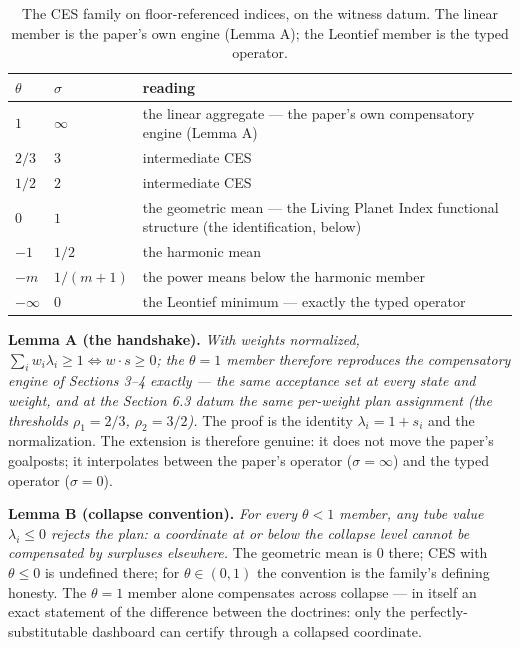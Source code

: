 \documentclass[3p,11pt]{elsarticle}
\begin{document}
\begin{table}[htbp]
\centering
\small
\caption{The CES family on floor-referenced indices, on the witness
datum. The linear member is the paper's own engine (Lemma A); the
Leontief member is the typed operator.}
\label{tab:sigmafamily}
\begin{tabular}{@{}llp{7.4cm}@{}}
\toprule
\(\theta\) & \(\sigma\) & reading \\
\midrule
\(1\) & \(\infty\) & the linear aggregate --- the paper's own compensatory engine (Lemma A) \\
\(2/3\) & \(3\) & intermediate CES \\
\(1/2\) & \(2\) & intermediate CES \\
\(0\) & \(1\) & the geometric mean --- the Living Planet Index functional structure (the identification, below) \\
\(-1\) & \(1/2\) & the harmonic mean \\
\(-m\) & \(1/(m+1)\) & the power means below the harmonic member \\
\(-\infty\) & \(0\) & the Leontief minimum --- exactly the typed operator \\
\bottomrule
\end{tabular}
\end{table}

\textbf{Lemma A (the handshake).} \emph{With weights normalized,
\(\sum_i w_i \lambda_i \ge 1 \iff w \cdot s \ge 0\); the
\(\theta = 1\) member therefore reproduces the compensatory engine of
Sections 3--4 exactly --- the same acceptance set at every state and
weight, and at the Section 6.3 datum the same per-weight plan assignment
(the thresholds \(\rho_1 = 2/3\), \(\rho_2 = 3/2\)).} The proof is
the identity \(\lambda_i = 1 + s_i\) and the normalization. The
extension is therefore genuine: it does not move the paper's goalposts;
it interpolates between the paper's operator (\(\sigma = \infty\))
and the typed operator (\(\sigma = 0\)).

\textbf{Lemma B (collapse convention).} \emph{For every \(\theta < 1\)
member, any tube value \(\lambda_i \le 0\) rejects the plan: a
coordinate at or below the collapse level cannot be compensated by
surpluses elsewhere.} The geometric mean is \(0\) there; CES with
\(\theta \le 0\) is undefined there; for \(\theta \in (0,1)\) the
convention is the family's defining honesty. The \(\theta = 1\) member
alone compensates across collapse --- in itself an exact statement of the
difference between the doctrines: only the perfectly-substitutable
dashboard can certify through a collapsed coordinate.
\end{document}
